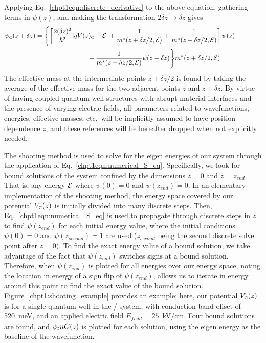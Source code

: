 \documentclass[12pt]{report}
\begin{document}
Applying Eq.~\eqref{chpt1eqn:discrete_derivative} to the above equation, gathering terms in $\psi(z)$, and making the transformation $2 \delta z \rightarrow \delta z$ gives
\begin{equation}
\label{chpt1eqn:numerical_S_eq}
\begin{split}
\psi_\tn{\tiny{C}}(z+\delta z) &= \Biggl\{ \left[ \frac{2(\delta z)^2}{\hslash^2} [q V(z)_\tn{\tiny{C}}-\EE]+\frac{1}{m^{*}(z+\delta z/2,\EE)}+\frac{1}{m^{*}(z-\delta z/2,\EE)} \right] \psi(z) \qquad \qquad\\
& \qquad \qquad \qquad \qquad  - \frac{1}{m^{*}(z-\delta z/2,\EE)} \psi(z-\delta z) \Biggr\} m^{*}(z+\delta z/2,\EE)
\end{split}
\end{equation}
The effective mass at the intermediate points $z\pm \delta z/2$ is found by taking the average of the effective mass for the two adjacent points $z$ and $z+\delta z$.  By virtue of having coupled quantum well structures with abrupt material interfaces and the presence of varying electric fields, all parameters related to wavefunctions, energies, effective masses, etc.\ will be implicitly assumed to have position-dependence $z$, and these references will be hereafter dropped when not explicitly needed.

The shooting method is used to solve for the eigen energies of our system through the application of Eq.~\eqref{chpt1eqn:numerical_S_eq}.  Specifically, we look for bound solutions of the system confined by the dimensions $z=0$ and $z=z_{end}$.  That is, any energy $\EE$ where $\psi(0)=0$ and $\psi(z_{end})=0$.  In an elementary implementation of the shooting method, the energy space covered by our potential $V_{\textnormal{\tiny{C}}}(z)$ is initially divided into many discrete steps.  Then, Eq.~\eqref{chpt1eqn:numerical_S_eq} is used to propagate through discrete steps in $z$ to find $\psi(z_{end})$ for each initial energy value, where the initial conditions $\psi(0)=0$ and $\psi(z_\textit{second})=1$  are used ($z_\textit{second}$ being the second discrete solve point after $z=0$).  To find the exact energy value of a bound solution, we take advantage of the fact that $\psi(z_{end})$ switches signs at a bound solution.  Therefore, when $\psi(z_{end})$ is plotted for all energies over our energy space, noting the location in energy of a sign flip of $\psi(z_{end})$, allows us to iterate in energy around this point to find the exact value of the bound solution.  Figure~\ref{chpt1:shooting_example} provides an example; here, our potential $V_{\textnormal{\tiny{C}}}(z)$ is for a single quantum well in the \InGaAs / \AlInAs system, with conduction band offset of 520~meV, and an applied electric field $E_\textit{field}=25$~kV/cm.  Four bound solutions are found, and $\psi_tn{\tiny{C}}(z)$ is plotted for each solution, using the eigen energy as the baseline of the wavefunction.
\end{document}
